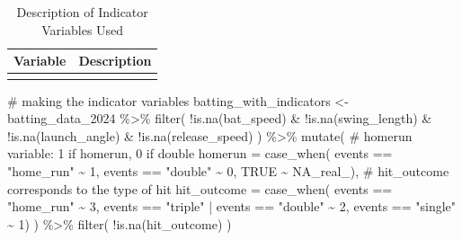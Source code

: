 \documentclass[
  letterpaper,
  DIV=11,
  numbers=noendperiod]{scrartcl}
\newenvironment{Shaded}{\begin{snugshade}}{\end{snugshade}}
\newcommand{\AttributeTok}[1]{\textcolor[rgb]{0.40,0.45,0.13}{#1}}
\newcommand{\CommentTok}[1]{\textcolor[rgb]{0.37,0.37,0.37}{#1}}
\newcommand{\ConstantTok}[1]{\textcolor[rgb]{0.56,0.35,0.01}{#1}}
\newcommand{\DecValTok}[1]{\textcolor[rgb]{0.68,0.00,0.00}{#1}}
\newcommand{\FunctionTok}[1]{\textcolor[rgb]{0.28,0.35,0.67}{#1}}
\newcommand{\NormalTok}[1]{\textcolor[rgb]{0.00,0.23,0.31}{#1}}
\newcommand{\OtherTok}[1]{\textcolor[rgb]{0.00,0.23,0.31}{#1}}
\newcommand{\SpecialCharTok}[1]{\textcolor[rgb]{0.37,0.37,0.37}{#1}}
\newcommand{\StringTok}[1]{\textcolor[rgb]{0.13,0.47,0.30}{#1}}
\begin{document}
\begin{table}[!h]
\centering
\caption{\label{tab:unnamed-chunk-7}Description of Indicator Variables Used}
\centering
\begin{tabular}[t]{>{\raggedright\arraybackslash}p{4cm}>{\raggedright\arraybackslash}p{7cm}}
\toprule
Variable & Description\\
\midrule
\cellcolor{gray!10}{hit\_outcome} & \cellcolor{gray!10}{Indicator for the type of hit recorded in the `events` variable. 1 = single, 2 = extra base hit (double or triple), 3 = homerun}\\
\bottomrule
\end{tabular}
\end{table}

\begin{Shaded}
\begin{Highlighting}[]
\CommentTok{\# making the indicator variables  }
\NormalTok{batting\_with\_indicators }\OtherTok{\textless{}{-}}\NormalTok{ batting\_data\_2024 }\SpecialCharTok{\%\textgreater{}\%} 
  \FunctionTok{filter}\NormalTok{(}
    \SpecialCharTok{!}\FunctionTok{is.na}\NormalTok{(bat\_speed) }\SpecialCharTok{\&}
      \SpecialCharTok{!}\FunctionTok{is.na}\NormalTok{(swing\_length) }\SpecialCharTok{\&}
      \SpecialCharTok{!}\FunctionTok{is.na}\NormalTok{(launch\_angle) }\SpecialCharTok{\&}
      \SpecialCharTok{!}\FunctionTok{is.na}\NormalTok{(release\_speed)}
\NormalTok{    ) }\SpecialCharTok{\%\textgreater{}\%}
  \FunctionTok{mutate}\NormalTok{(}
    \CommentTok{\# homerun variable: 1 if homerun, 0 if double }
    \AttributeTok{homerun =} \FunctionTok{case\_when}\NormalTok{(}
\NormalTok{      events }\SpecialCharTok{==} \StringTok{"home\_run"} \SpecialCharTok{\textasciitilde{}} \DecValTok{1}\NormalTok{,}
\NormalTok{      events }\SpecialCharTok{==} \StringTok{"double"} \SpecialCharTok{\textasciitilde{}} \DecValTok{0}\NormalTok{,}
      \ConstantTok{TRUE} \SpecialCharTok{\textasciitilde{}} \ConstantTok{NA\_real\_}\NormalTok{),}
    \CommentTok{\# hit\_outcome corresponds to the type of hit }
    \AttributeTok{hit\_outcome =} \FunctionTok{case\_when}\NormalTok{(}
\NormalTok{      events }\SpecialCharTok{==} \StringTok{"home\_run"} \SpecialCharTok{\textasciitilde{}} \DecValTok{3}\NormalTok{,}
\NormalTok{      events }\SpecialCharTok{==} \StringTok{"triple"} \SpecialCharTok{|}\NormalTok{ events }\SpecialCharTok{==} \StringTok{"double"} \SpecialCharTok{\textasciitilde{}} \DecValTok{2}\NormalTok{,}
\NormalTok{      events }\SpecialCharTok{==} \StringTok{"single"} \SpecialCharTok{\textasciitilde{}} \DecValTok{1}\NormalTok{)}
\NormalTok{    ) }\SpecialCharTok{\%\textgreater{}\%}
  \FunctionTok{filter}\NormalTok{(}
    \SpecialCharTok{!}\FunctionTok{is.na}\NormalTok{(hit\_outcome)}
\NormalTok{    )}
\end{Highlighting}
\end{Shaded}
\end{document}
